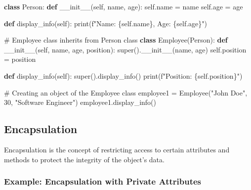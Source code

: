 \documentclass[
  letterpaper,
  DIV=11,
  numbers=noendperiod]{scrreprt}
\newenvironment{Shaded}{\begin{snugshade}}{\end{snugshade}}
\newcommand{\BuiltInTok}[1]{\textcolor[rgb]{0.00,0.23,0.31}{#1}}
\newcommand{\CommentTok}[1]{\textcolor[rgb]{0.37,0.37,0.37}{#1}}
\newcommand{\DecValTok}[1]{\textcolor[rgb]{0.68,0.00,0.00}{#1}}
\newcommand{\FunctionTok}[1]{\textcolor[rgb]{0.28,0.35,0.67}{#1}}
\newcommand{\KeywordTok}[1]{\textcolor[rgb]{0.00,0.23,0.31}{\textbf{#1}}}
\newcommand{\NormalTok}[1]{\textcolor[rgb]{0.00,0.23,0.31}{#1}}
\newcommand{\OperatorTok}[1]{\textcolor[rgb]{0.37,0.37,0.37}{#1}}
\newcommand{\SpecialCharTok}[1]{\textcolor[rgb]{0.37,0.37,0.37}{#1}}
\newcommand{\SpecialStringTok}[1]{\textcolor[rgb]{0.13,0.47,0.30}{#1}}
\newcommand{\StringTok}[1]{\textcolor[rgb]{0.13,0.47,0.30}{#1}}
\newcommand{\VariableTok}[1]{\textcolor[rgb]{0.07,0.07,0.07}{#1}}
\begin{document}
\begin{Shaded}
\begin{Highlighting}[]
\KeywordTok{class}\NormalTok{ Person:}
    \KeywordTok{def} \FunctionTok{\_\_init\_\_}\NormalTok{(}\VariableTok{self}\NormalTok{, name, age):}
        \VariableTok{self}\NormalTok{.name }\OperatorTok{=}\NormalTok{ name}
        \VariableTok{self}\NormalTok{.age }\OperatorTok{=}\NormalTok{ age}
    
    \KeywordTok{def}\NormalTok{ display\_info(}\VariableTok{self}\NormalTok{):}
        \BuiltInTok{print}\NormalTok{(}\SpecialStringTok{f"Name: }\SpecialCharTok{\{}\VariableTok{self}\SpecialCharTok{.}\NormalTok{name}\SpecialCharTok{\}}\SpecialStringTok{, Age: }\SpecialCharTok{\{}\VariableTok{self}\SpecialCharTok{.}\NormalTok{age}\SpecialCharTok{\}}\SpecialStringTok{"}\NormalTok{)}

\CommentTok{\# Employee class inherits from Person class}
\KeywordTok{class}\NormalTok{ Employee(Person):}
    \KeywordTok{def} \FunctionTok{\_\_init\_\_}\NormalTok{(}\VariableTok{self}\NormalTok{, name, age, position):}
        \BuiltInTok{super}\NormalTok{().}\FunctionTok{\_\_init\_\_}\NormalTok{(name, age)}
        \VariableTok{self}\NormalTok{.position }\OperatorTok{=}\NormalTok{ position}
    
    \KeywordTok{def}\NormalTok{ display\_info(}\VariableTok{self}\NormalTok{):}
        \BuiltInTok{super}\NormalTok{().display\_info()}
        \BuiltInTok{print}\NormalTok{(}\SpecialStringTok{f"Position: }\SpecialCharTok{\{}\VariableTok{self}\SpecialCharTok{.}\NormalTok{position}\SpecialCharTok{\}}\SpecialStringTok{"}\NormalTok{)}

\CommentTok{\# Creating an object of the Employee class}
\NormalTok{employee1 }\OperatorTok{=}\NormalTok{ Employee(}\StringTok{"John Doe"}\NormalTok{, }\DecValTok{30}\NormalTok{, }\StringTok{"Software Engineer"}\NormalTok{)}
\NormalTok{employee1.display\_info()}
\end{Highlighting}
\end{Shaded}

\subsection{Encapsulation}\label{encapsulation}

Encapsulation is the concept of restricting access to certain attributes
and methods to protect the integrity of the object's data.

\subsubsection{Example: Encapsulation with Private
Attributes}\label{example-encapsulation-with-private-attributes}
\end{document}

